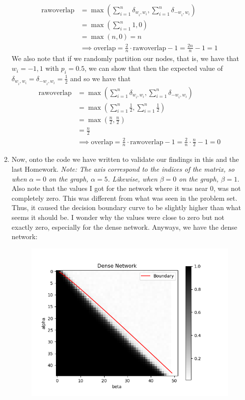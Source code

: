 \documentclass[11pt]{article}
\begin{document}
\begin{enumerate}
	\begin{align*}
		\text{rawoverlap} &= \max \left( \sum_{i=1}^n \delta_{w_i^{~}, w_i}, \sum_{i=1}^n \delta_{-w_i^{~}, w_i}\right) \\
		&= \max \left( \sum_{i=1}^n 1, 0\right) \\
		&= \max (n, 0) = n \\
		&\implies \text{overlap} = \frac{2}{n} \cdot \text{rawoverlap} - 1 = \frac{2n}{n} - 1 = 1
	\end{align*}
	We also note that if we randomly partition our nodes, that is, we have that $w_i = {-1, 1}$ with $p_i = 0.5$, we can show that then the expected value of
	$\delta_{w_i^{~}, w_i} = \delta_{-w_i^{~}, w_i} = \frac{1}{2}$ and so we have that
	\begin{align*}
		\text{rawoverlap} &= \max \left( \sum_{i=1}^n \delta_{w_i^{~}, w_i}, \sum_{i=1}^n \delta_{-w_i^{~}, w_i}\right) \\
		&= \max \left( \sum_{i=1}^n \frac{1}{2}, \sum_{i=1}^n \frac{1}{2} \right) \\
		&= \max \left( \frac{n}{2}, \frac{n}{2}\right) \\
		&= \frac{n}{2} \\
		&\implies \text{overlap} = \frac{2}{n} \cdot \text{rawoverlap} - 1 = \frac{2}{n} \cdot \frac{n}{2} - 1 = 0
	\end{align*}
	\item Now, onto the code we have written to validate our findings in this and the last Homework. \textit{Note: The axis correspond to the indices of the matrix, so when $\alpha = 0$ on the graph, $\alpha = 5$. Likewise, when $\beta = 0$ on the graph, $\beta = 1$}.
	Also note that the values I got for the network where it was near 0, was not completely zero. This was different from what was seen in the problem set. Thus, it caused the decision boundary curve to be slightly higher than what seems it should be. I wonder why the values were close to zero but not exactly zero, especially for the dense network. Anyways, we have the dense network:
	\begin{figure}[H]
	\includegraphics[width=12cm]{DenseScoreGraph.png}

\end{figure}
\end{enumerate}
\end{document}
